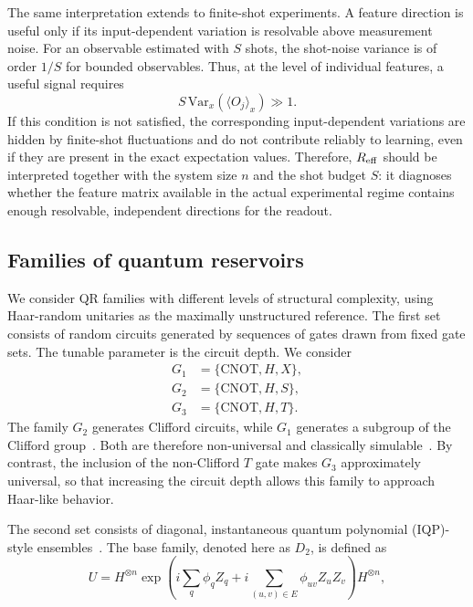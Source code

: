\documentclass[
    aps,
    pre,
    amsmath,
    amssymb,
    reprint,
    superscriptaddress,
    preprintnumbers,
]{revtex4-2}
\begin{document}
The same interpretation extends to finite-shot experiments. A feature direction is useful only if its input-dependent variation is resolvable above measurement noise. For an observable estimated with $S$ shots, the shot-noise variance is of order $1/S$ for bounded observables. Thus, at the level of individual features, a useful signal requires
\begin{equation}
S \, \mathrm{Var}_x(\langle O_j\rangle_x) \gg 1 .
\label{eq:shot-resolvability}
\end{equation}
If this condition is not satisfied, the corresponding input-dependent variations are hidden by finite-shot fluctuations and do not contribute reliably to learning, even if they are present in the exact expectation values. Therefore, $R_{\rm eff}$ should be interpreted together with the system size $n$ and the shot budget $S$: it diagnoses whether the feature matrix available in the actual experimental regime contains enough resolvable, independent directions for the readout.

\subsection{Families of quantum reservoirs}
\label{sec:methods-families}

We consider QR families with different levels of structural complexity, using Haar-random unitaries as the maximally unstructured reference. The first set consists of random circuits generated by sequences of gates drawn from fixed gate sets. The tunable parameter is the circuit depth. We consider
\begin{align*}
G_1 &= \{\mathrm{CNOT}, H, X\}, \\
G_2 &= \{\mathrm{CNOT}, H, S\}, \\
G_3 &= \{\mathrm{CNOT}, H, T\}.
\end{align*}
The family $G_2$ generates Clifford circuits, while $G_1$ generates a subgroup of the Clifford group~\cite{gottesman1998heisenberg, clark2008generalized}. Both are therefore non-universal and classically simulable~\cite{vandennest2010classical, jozsa2014classical, koh2017further}. By contrast, the inclusion of the non-Clifford $T$ gate makes $G_3$ approximately universal, so that increasing the circuit depth allows this family to approach Haar-like behavior.

The second set consists of diagonal, instantaneous quantum polynomial (IQP)-style ensembles~\cite{bremner2011classical, ni2013commuting, fujii2017commuting}. The base family, denoted here as $D_2$, is defined as
\begin{equation}
U
=
H^{\otimes n}
\exp\!\left(
i\sum_q \phi_q Z_q
+
i\!\!\sum_{(u,v)\in E}\!\! \phi_{uv} Z_u Z_v
\right)
H^{\otimes n},
\end{equation}
\end{document}
